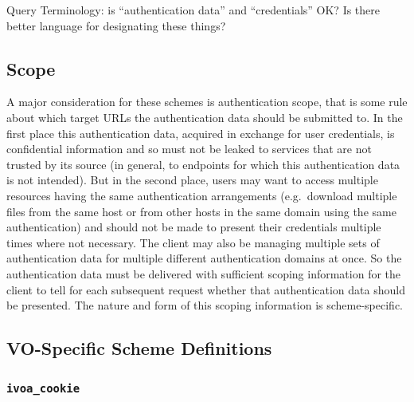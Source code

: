 \documentclass[11pt,a4paper]{ivoa}
\begin{document}
\begin{admonition}{Query}
  Terminology: is ``authentication data'' and ``credentials'' OK?
  Is there better language for designating these things?
\end{admonition}


\subsection{Scope}\label{sec:scope}

A major consideration for these schemes is authentication scope,
that is some rule about which target URLs the authentication data
should be submitted to.
In the first place this authentication data,
acquired in exchange for user credentials,
is confidential information and so must not be leaked to services
that are not trusted by its source
(in general, to endpoints for which this authentication data is
not intended).
But in the second place, users may want to access multiple resources
having the same authentication arrangements
(e.g.\ download multiple files from the same host or from
other hosts in the same domain using the same authentication)
and should not be made to present their credentials
multiple times where not necessary.
The client may also be managing multiple sets of authentication data
for multiple different authentication domains at once.
So the authentication data must be delivered with sufficient scoping
information for the client to tell for each subsequent request
whether that authentication data should be presented.
The nature and form of this scoping information is scheme-specific.



\subsection{VO-Specific Scheme Definitions}\label{sec:voschemes}

\subsubsection{\mbox{\tt ivoa\_cookie}}\label{sec:ivoa-cookie}
\end{document}
